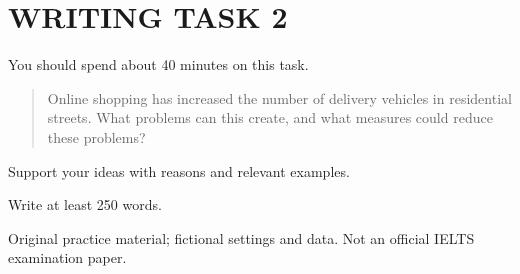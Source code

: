 \section*{WRITING TASK 2}
You should spend about 40 minutes on this task.

\begin{quote}\large Online shopping has increased the number of delivery vehicles in residential streets. What problems can this create, and what measures could reduce these problems?
\end{quote}
Support your ideas with reasons and relevant examples.

Write at least 250 words.
\par\bigskip
{\footnotesize\color{gray} Original practice material; fictional settings and data. Not an official IELTS examination paper.}
